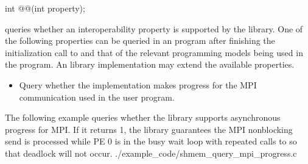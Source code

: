 \begin{apidefinition}

\begin{Csynopsis}
int @@(int property);
\end{Csynopsis}

\begin{apiarguments}
\end{apiarguments}

 queries whether an interoperability property
is supported by the \openshmem library. One of the following properties can be 
queried in an \openshmem program after finishing the
initialization call to \openshmem and that of the relevant programming models
being used in the program. An \openshmem library implementation may extend the
available properties.

\begin{itemize}
\item {} Query whether the \openshmem
implementation makes progress for the MPI communication used in the user program.
\end{itemize}


\begin{apiexamples}

\apicexample
    {The following example queries whether the \openshmem library supports asynchronous
progress for MPI. If it returns 1, the library guarantees the MPI nonblocking send
is processed while PE 0 is in the busy wait loop with repeated calls to
 so that deadlock will not occur.}
    {./example_code/shmem_query_mpi_progress.c}
    {}

\end{apiexamples}

\end{apidefinition}
